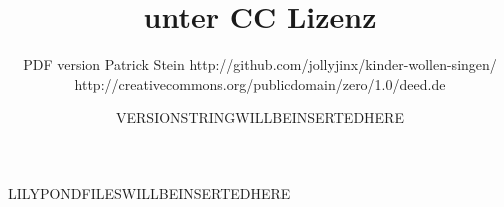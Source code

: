 \documentclass[10pt]{article}
\title{ unter CC Lizenz}
\author{ PDF version Patrick Stein http://github.com/jollyjinx/kinder-wollen-singen/  \\ http://creativecommons.org/publicdomain/zero/1.0/deed.de }
\date{VERSIONSTRINGWILLBEINSERTEDHERE}
\begin{document}
\maketitle

\begin{adjustwidth}{1.5cm}{1.5cm}
\tableofcontents
\end{adjustwidth}

\pagebreak

LILYPONDFILESWILLBEINSERTEDHERE
\end{document}
